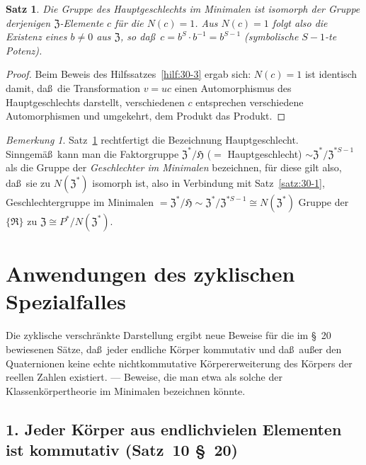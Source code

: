 \documentclass[12pt,a4paper]{article}
\theoremstyle{plain}
\newtheorem{satz}{Satz}[section]
\theoremstyle{definition}
\theoremstyle{remark}
\newtheorem{bemerkung}{Bemerkung}[section]
\begin{document}
\begin{satz}\label{satz:30-2}
Die Gruppe des Hauptgeschlechts im Minimalen ist isomorph der
Gruppe derjenigen $\mathfrak{Z}$-Elemente $c$ f\"ur die $N(c) = 1$. Aus
$N(c) = 1$ folgt also die Existenz eines $b \neq 0$ aus $\mathfrak{Z}$, so
da\ss\ $c = b^{S} \cdot b^{-1} = b^{S-1}$ (symbolische $S-1$-te Potenz).
\end{satz}

\begin{proof}
Beim Beweis des Hilfssatzes~\ref{hilf:30-3} ergab sich:
$N(c) = 1$ ist identisch damit, da\ss\ die Transformation $v = uc$
einen Automorphismus des Hauptgeschlechts darstellt,
verschiedenen $c$ entsprechen verschiedene Automorphismen und
umgekehrt, dem Produkt das Produkt.
\end{proof}

\begin{bemerkung}
Satz~\ref{satz:30-2} rechtfertigt die Bezeichnung
Hauptgeschlecht. Sinngem\"a\ss\ kann man die Faktorgruppe
$\mathfrak{Z}^{*}/\mathfrak{H}$ ($=$ Hauptgeschlecht) $\sim \mathfrak{Z}^{*}/\mathfrak{Z}^{*S-1}$
als die Gruppe der \textit{Geschlechter im Minimalen} bezeichnen,
f\"ur diese gilt also, da\ss\ sie zu $N(\mathfrak{Z}^{*})$ isomorph ist, also in
Verbindung mit Satz~\ref{satz:30-1},
Geschlechtergruppe im Minimalen $= \mathfrak{Z}^{*}/\mathfrak{H} \sim \mathfrak{Z}^{*}/\mathfrak{Z}^{*S-1} \cong N(\mathfrak{Z}^{*})$
Gruppe der $\{\mathfrak{R}\}$ zu $\mathfrak{Z} \cong P^{*}/N(\mathfrak{Z}^{*})$.
\end{bemerkung}

\newpage
\section{Anwendungen des zyklischen Spezialfalles}\label{sec:31}

Die zyklische verschr\"ankte Darstellung ergibt neue Beweise f\"ur die
im \S~20 bewiesenen S\"atze, da\ss\ jeder endliche K\"orper kommutativ
und da\ss\ au\ss er den Quaternionen keine echte nichtkommutative
K\"orpererweiterung des K\"orpers der reellen Zahlen existiert. ---
Beweise, die man etwa als solche der Klassenk\"orpertheorie im
Minimalen bezeichnen k\"onnte.

\subsection*{1. Jeder K\"orper aus endlichvielen Elementen ist kommutativ (Satz~10 \S~20)}
\end{document}
